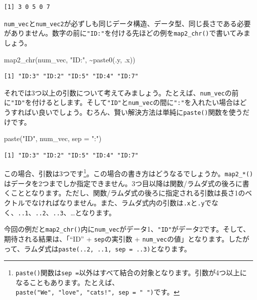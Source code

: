 \documentclass[
  a4paper,
  pandoc,
  ja=standard,
  jafont=haranoaji]{bxjsbook}
\newenvironment{Shaded}{\begin{snugshade}}{\end{snugshade}}
\newcommand{\AttributeTok}[1]{\textcolor[rgb]{0.00,0.48,0.65}{#1}}
\newcommand{\FunctionTok}[1]{\textcolor[rgb]{0.28,0.35,0.67}{#1}}
\newcommand{\NormalTok}[1]{\textcolor[rgb]{0.00,0.48,0.65}{#1}}
\newcommand{\SpecialCharTok}[1]{\textcolor[rgb]{0.37,0.37,0.37}{#1}}
\newcommand{\StringTok}[1]{\textcolor[rgb]{0.13,0.47,0.30}{#1}}
\begin{document}
\begin{verbatim}
[1] 3 0 5 0 7
\end{verbatim}

\texttt{num\_vec}と\texttt{num\_vec2}が必ずしも同じデータ構造、データ型、同じ長さである必要がありません。数字の前に\texttt{"ID:"}を付ける先ほどの例を\texttt{map2\_chr()}で書いてみましょう。

\begin{Shaded}
\begin{Highlighting}[numbers=left,,]
\FunctionTok{map2\_chr}\NormalTok{(num\_vec, }\StringTok{"ID:"}\NormalTok{, }\SpecialCharTok{\textasciitilde{}}\FunctionTok{paste0}\NormalTok{(.y, .x))}
\end{Highlighting}
\end{Shaded}

\begin{verbatim}
[1] "ID:3" "ID:2" "ID:5" "ID:4" "ID:7"
\end{verbatim}

それでは3つ以上の引数について考えてみましょう。たとえば、\texttt{num\_vec}の前に\texttt{"ID"}を付けるとします。そして\texttt{"ID"}と\texttt{num\_vec}の間に\texttt{":"}を入れたい場合はどうすればい良いでしょう。むろん、賢い解決方法は単純に\texttt{paste()}関数を使うだけです。

\begin{Shaded}
\begin{Highlighting}[numbers=left,,]
\FunctionTok{paste}\NormalTok{(}\StringTok{"ID"}\NormalTok{, num\_vec, }\AttributeTok{sep =} \StringTok{":"}\NormalTok{)}
\end{Highlighting}
\end{Shaded}

\begin{verbatim}
[1] "ID:3" "ID:2" "ID:5" "ID:4" "ID:7"
\end{verbatim}

この場合、引数は3つです\footnote{\texttt{paste()}関数は\texttt{sep\ =}以外はすべて結合の対象となります。引数が4つ以上になることもあります。たとえば、\texttt{paste("We",\ "love",\ "cats!",\ sep\ =\ "\ ")}です。}。この場合の書き方はどうなるでしょうか。\texttt{map2\_*()}はデータを2つまでしか指定できません。3つ目以降は関数/ラムダ式の後ろに書くこととなります。ただし、関数/ラムダ式の後ろに指定される引数は長さ1のベクトルでなければなりません。また、ラムダ式内の引数は\texttt{.x}と\texttt{.y}でなく、\texttt{..1}、\texttt{..2}、\texttt{..3}、\ldots となります。

今回の例だと\texttt{map2\_chr()}内に\texttt{num\_vec}がデータ1、\texttt{"ID"}がデータ2です。そして、期待される結果は、「``ID''
+ \texttt{sep}の実引数 +
\texttt{num\_vec}の値」となります。したがって、ラムダ式は\texttt{paste(..2,\ ..1,\ sep\ =\ ..3)}となります。
\end{document}
